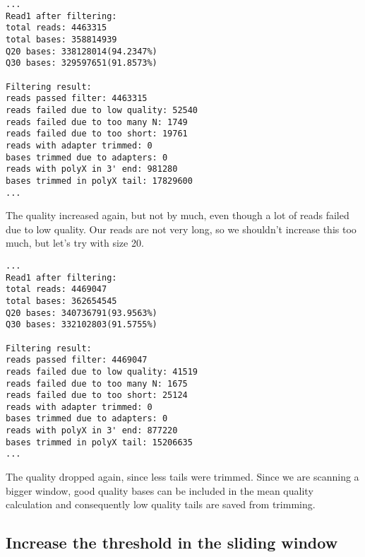 \begin{verbatim}
...
Read1 after filtering:
total reads: 4463315
total bases: 358814939
Q20 bases: 338128014(94.2347%)
Q30 bases: 329597651(91.8573%)

Filtering result:
reads passed filter: 4463315
reads failed due to low quality: 52540
reads failed due to too many N: 1749
reads failed due to too short: 19761
reads with adapter trimmed: 0
bases trimmed due to adapters: 0
reads with polyX in 3' end: 981280
bases trimmed in polyX tail: 17829600
...
\end{verbatim}

The quality increased again, but not by much, even though a lot of reads
failed due to low quality. Our reads are not very long, so we shouldn't
increase this too much, but let's try with size 20.

\begin{Shaded}
\begin{Highlighting}[]
\end{Highlighting}
\end{Shaded}

\begin{verbatim}
...
Read1 after filtering:
total reads: 4469047
total bases: 362654545
Q20 bases: 340736791(93.9563%)
Q30 bases: 332102803(91.5755%)

Filtering result:
reads passed filter: 4469047
reads failed due to low quality: 41519
reads failed due to too many N: 1675
reads failed due to too short: 25124
reads with adapter trimmed: 0
bases trimmed due to adapters: 0
reads with polyX in 3' end: 877220
bases trimmed in polyX tail: 15206635
...
\end{verbatim}

The quality dropped again, since less tails were trimmed. Since we are
scanning a bigger window, good quality bases can be included in the mean
quality calculation and consequently low quality tails are saved from
trimming.

\hypertarget{increase-the-threshold-in-the-sliding-window}{%
\subsection{Increase the threshold in the sliding
window}\label{increase-the-threshold-in-the-sliding-window}}

